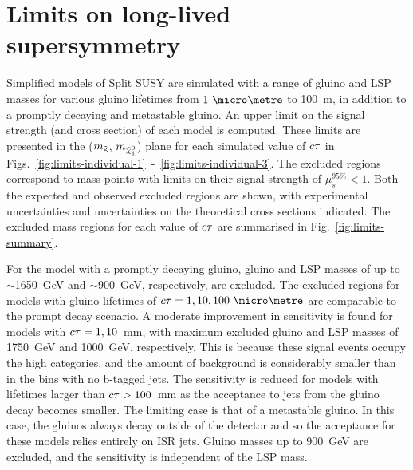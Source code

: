 \section{Limits on long-lived supersymmetry}
\label{sec:results-limits}
Simplified models of Split SUSY are simulated with a range of gluino and LSP 
masses for various gluino lifetimes from $1~\micro\metre$ to 100~m, in addition 
to a 
promptly decaying and metastable gluino. An upper limit on the signal strength 
(and cross section) of each model is computed. These limits are presented in 
the ($m_{\mathrm{\tilde{g}}}$, $m_{\tilde{\chi}_1^0}$) plane for each simulated value of $c\tau$ in 
Figs.~\ref{fig:limits-individual-1}~-~\ref{fig:limits-individual-3}.
The excluded regions correspond to mass points with limits on their signal 
strength of $\mu_s^{95\%} < 1$. 
Both the expected and observed excluded regions are shown, with experimental 
uncertainties and uncertainties on the theoretical cross sections indicated. 
The excluded mass regions for each value of $c\tau$ are summarised in 
Fig.~\ref{fig:limits-summary}.


For the model with a promptly decaying gluino, gluino and LSP masses of up to 
$\sim$1650~GeV and $\sim$900~GeV, respectively, are excluded. The excluded 
regions for models with gluino lifetimes of $\ctau = 1, 10, 100~\micro\metre$ 
are comparable to the prompt decay scenario. 
A moderate improvement in sensitivity is found for models with $c\tau = 1, 
10$~mm, with maximum excluded gluino and LSP masses of 1750~GeV and 1000~GeV, 
respectively. This is because these signal events occupy the high \nb 
categories, and the amount of background is considerably smaller than in the 
bins with no b-tagged jets. 
The sensitivity is reduced for models with lifetimes larger than $c\tau > 
100$~mm as the acceptance to jets from the gluino decay becomes smaller. The 
limiting case is that of a metastable gluino. In this case, the gluinos always 
decay outside of the detector and so the acceptance for these models relies 
entirely on ISR jets. Gluino masses up to 900~GeV are excluded, and the 
sensitivity is independent of the LSP mass.

